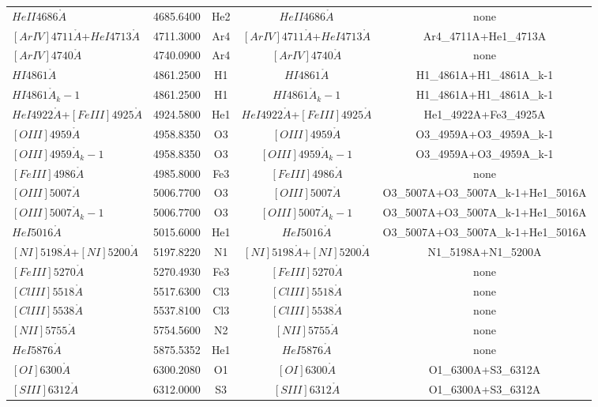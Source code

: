 \documentclass{article}%
\begin{document}
\begin{preview}
\begin{tabular}{lcccc}
$HeII4686\mathring{A}$&4685.6400&He2&$HeII4686\mathring{A}$&none\\%
$[ArIV]4711\mathring{A}$+$HeI4713\mathring{A}$&4711.3000&Ar4&$[ArIV]4711\mathring{A}$+$HeI4713\mathring{A}$&Ar4\_4711A+He1\_4713A\\%
$[ArIV]4740\mathring{A}$&4740.0900&Ar4&$[ArIV]4740\mathring{A}$&none\\%
$HI4861\mathring{A}$&4861.2500&H1&$HI4861\mathring{A}$&H1\_4861A+H1\_4861A\_k{-}1\\%
$HI4861\mathring{A}_k-1$&4861.2500&H1&$HI4861\mathring{A}_k-1$&H1\_4861A+H1\_4861A\_k{-}1\\%
$HeI4922\mathring{A}$+$[FeIII]4925\mathring{A}$&4924.5800&He1&$HeI4922\mathring{A}$+$[FeIII]4925\mathring{A}$&He1\_4922A+Fe3\_4925A\\%
$[OIII]4959\mathring{A}$&4958.8350&O3&$[OIII]4959\mathring{A}$&O3\_4959A+O3\_4959A\_k{-}1\\%
$[OIII]4959\mathring{A}_k-1$&4958.8350&O3&$[OIII]4959\mathring{A}_k-1$&O3\_4959A+O3\_4959A\_k{-}1\\%
$[FeIII]4986\mathring{A}$&4985.8000&Fe3&$[FeIII]4986\mathring{A}$&none\\%
$[OIII]5007\mathring{A}$&5006.7700&O3&$[OIII]5007\mathring{A}$&O3\_5007A+O3\_5007A\_k{-}1+He1\_5016A\\%
$[OIII]5007\mathring{A}_k-1$&5006.7700&O3&$[OIII]5007\mathring{A}_k-1$&O3\_5007A+O3\_5007A\_k{-}1+He1\_5016A\\%
$HeI5016\mathring{A}$&5015.6000&He1&$HeI5016\mathring{A}$&O3\_5007A+O3\_5007A\_k{-}1+He1\_5016A\\%
$[NI]5198\mathring{A}$+$[NI]5200\mathring{A}$&5197.8220&N1&$[NI]5198\mathring{A}$+$[NI]5200\mathring{A}$&N1\_5198A+N1\_5200A\\%
$[FeIII]5270\mathring{A}$&5270.4930&Fe3&$[FeIII]5270\mathring{A}$&none\\%
$[ClIII]5518\mathring{A}$&5517.6300&Cl3&$[ClIII]5518\mathring{A}$&none\\%
$[ClIII]5538\mathring{A}$&5537.8100&Cl3&$[ClIII]5538\mathring{A}$&none\\%
$[NII]5755\mathring{A}$&5754.5600&N2&$[NII]5755\mathring{A}$&none\\%
$HeI5876\mathring{A}$&5875.5352&He1&$HeI5876\mathring{A}$&none\\%
$[OI]6300\mathring{A}$&6300.2080&O1&$[OI]6300\mathring{A}$&O1\_6300A+S3\_6312A\\%
$[SIII]6312\mathring{A}$&6312.0000&S3&$[SIII]6312\mathring{A}$&O1\_6300A+S3\_6312A\\%

\end{tabular}
\end{preview}
\end{document}
